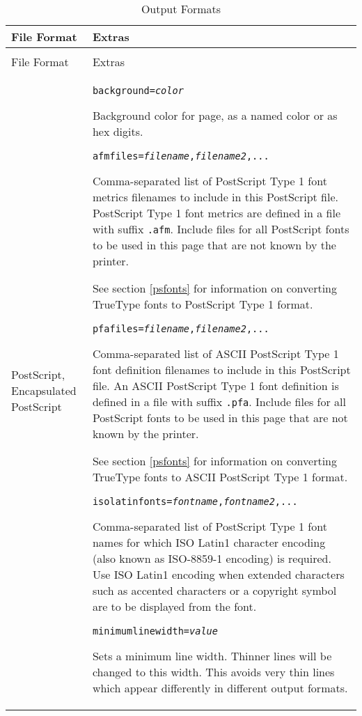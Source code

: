 \begin{longtable}{|p{4cm}|p{10cm}|}
\hline
\label{outputformats}
File Format & Extras \\
\hline
\hline
\endfirsthead
\hline
\caption{Output Formats} \\
\endfoot

\hline
File Format & Extras \\
\hline
\hline
\endhead

PostScript, Encapsulated PostScript &

\texttt{background=\textit{color}}

Background color for page, as a named color or as hex digits.

\vspace{10pt}
\texttt{afmfiles=\textit{filename},\textit{filename2},...}

Comma-separated list of PostScript Type 1 font metrics filenames
to include in this PostScript file.
PostScript Type 1 font metrics are defined in a file
with suffix \texttt{.afm}.  Include
files for all PostScript fonts to be used in this
page that are not known by the printer.

See section \ref{psfonts} for
information on converting TrueType fonts to PostScript Type 1 format.

\vspace{10pt}
\texttt{pfafiles=\textit{filename},\textit{filename2},...}

Comma-separated list of ASCII PostScript Type 1 font definition filenames
to include in this PostScript file.
An ASCII PostScript Type 1 font definition is defined in a file
with suffix \texttt{.pfa}.  Include
files for all PostScript fonts to be used in this
page that are not known by the printer.

See section \ref{psfonts} for
information on converting TrueType fonts to ASCII PostScript Type 1 format.

\vspace{10pt}
\texttt{isolatinfonts=\textit{fontname},\textit{fontname2},...}

Comma-separated list of PostScript Type 1 font names for
which ISO Latin1 character encoding
(also known as ISO-8859-1 encoding)
is required.  Use ISO Latin1 encoding
when extended characters such as accented characters
or a copyright symbol are to be displayed from the font.

\vspace{10pt}
\texttt{minimumlinewidth=\textit{value}}

Sets a minimum line width.  Thinner lines will be changed to
this width.  This avoids very thin lines which appear differently
in different output formats.


\end{longtable}

